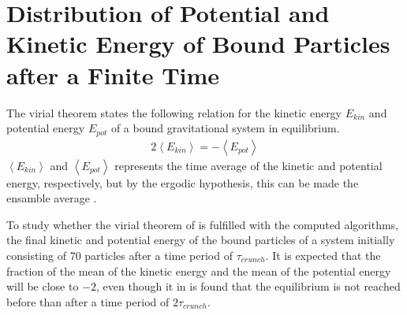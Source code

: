 \section{Distribution of Potential and Kinetic Energy of Bound Particles after a Finite Time}
\label{sec:DistributionPotKinEnBound}
The virial theorem states the following relation for the kinetic energy $E_{kin}$ and potential energy $E_{pot}$ of a bound gravitational system in equilibrium. 
\begin{align}
	2\left< E_{kin} \right> = - \left< E_{pot} \right>
	\label{eq:ViralTheorem}
\end{align}
$\left< E_{kin} \right>$ and $\left< E_{pot} \right>$ represents the time average of the kinetic and potential energy, respectively, but by the ergodic hypothesis, this can be made the ensamble average \cite{Project5_CompPhys}. 

To study whether the virial theorem of  is fulfilled with the computed algorithms, the final kinetic and potential energy of the bound particles of a system initially consisting of 70 particles after a time period of $\tau_{crunch}$.
It is expected that the fraction of the mean of the kinetic energy and the mean of the potential energy will be close to $-2$, even though it in  is found that the equilibrium is not reached before than after a time period of $2\tau_{crunch}$. 

